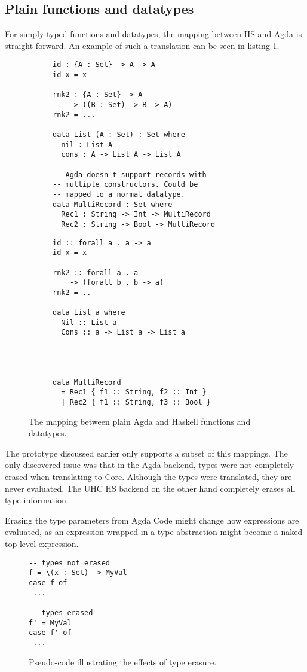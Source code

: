 \documentclass[12pt, a4paper, twoside]{report}
\begin{document}
\subsection{Plain functions and datatypes}
For simply-typed functions and datatypes, the mapping between HS and Agda is straight-forward. An example of such
a translation can be seen in listing \ref{lst:plain-agda-hs}.
\begin{figure}
\begin{subfigure}[b]{0.5\textwidth}
\begin{lstlisting}
id : {A : Set} -> A -> A
id x = x

rnk2 : {A : Set} -> A
    -> ((B : Set) -> B -> A)
rnk2 = ...

data List (A : Set) : Set where
  nil : List A
  cons : A -> List A -> List A

-- Agda doesn't support records with
-- multiple constructors. Could be
-- mapped to a normal datatype.
data MultiRecord : Set where
  Rec1 : String -> Int -> MultiRecord
  Rec2 : String -> Bool -> MultiRecord
\end{lstlisting}
\end{subfigure}
\hspace{10pt}
\begin{subfigure}[b]{0.5\textwidth}
\begin{lstlisting}
id :: forall a . a -> a
id x = x

rnk2 :: forall a . a
    -> (forall b . b -> a)
rnk2 = ..

data List a where
  Nil :: List a
  Cons :: a -> List a -> List a




data MultiRecord
  = Rec1 { f1 :: String, f2 :: Int }
  | Rec2 { f1 :: String, f3 :: Bool }
\end{lstlisting}
\end{subfigure}
\caption{The mapping between plain Agda and Haskell functions and datatypes.}
\label{lst:plain-agda-hs}
\end{figure}

The prototype discussed earlier only supports a subset of this mappings. The only discovered
issue was that in the Agda backend, types were not completely erased when translating to Core.
Although the types were translated, they are never evaluated. The UHC HS backend on the
other hand completely erases all type information.

Erasing the type parameters from Agda Code might change how expressions are evaluated,
as an expression wrapped in a type abstraction might become a naked top level
expression.
\begin{figure}
\begin{lstlisting}
-- types not erased
f = \(x : Set) -> MyVal
case f of
 ... 

-- types erased
f' = MyVal
case f' of
 ...
\end{lstlisting}
\caption{Pseudo-code illustrating the effects of type erasure.}
\label{lst:pseu-ty-eras}
\end{figure}
\end{document}
